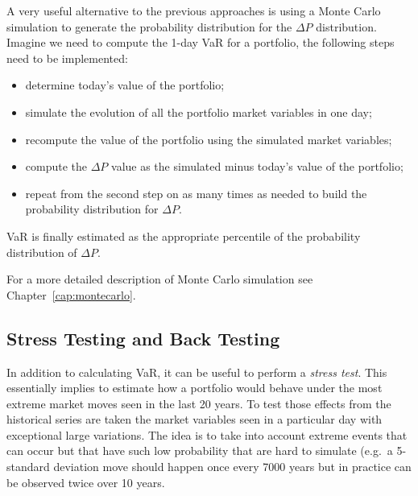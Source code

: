 A very useful alternative to the previous approaches is using a Monte
Carlo simulation to generate the probability distribution for the
\(\Delta P\) distribution. Imagine we need to compute the 1-day VaR for
a portfolio, the following steps need to be implemented:

\begin{itemize}
\tightlist
\item
  determine today's value of the portfolio;
\item
  simulate the evolution of all the portfolio market variables in one
  day;
\item
  recompute the value of the portfolio using the simulated market
  variables;
\item
  compute the \(\Delta P\) value as the simulated minus today's value of
  the portfolio;
\item
  repeat from the second step on as many times as needed to build the
  probability distribution for \(\Delta P\).
\end{itemize}

VaR is finally estimated as the appropriate percentile of the
probability distribution of \(\Delta P\).

For a more detailed description of Monte Carlo simulation see Chapter~\ref{cap:montecarlo}.

\subsection{Stress Testing and Back
Testing}\label{stress-testing-and-back-testing}

In addition to calculating VaR, it can be useful to perform a
\emph{stress test}. This essentially implies to estimate how a portfolio
would behave under the most extreme market moves seen in the last 20
years. To test those effects from the historical series are taken the
market variables seen in a particular day with exceptional large
variations. The idea is to take into account extreme events that can
occur but that have such low probability that are hard to simulate
(e.g.~a 5-standard deviation move should happen once every 7000 years
but in practice can be observed twice over 10 years.

